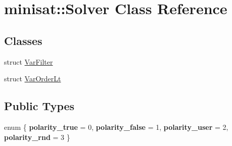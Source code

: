 \hypertarget{classminisat_1_1Solver}{\section{minisat\-:\-:\-Solver \-Class \-Reference}
\label{classminisat_1_1Solver}
}
\subsection*{\-Classes}
\begin{DoxyCompactItemize}
\item 
struct \hyperlink{structminisat_1_1Solver_1_1VarFilter}{\-Var\-Filter}
\item 
struct \hyperlink{structminisat_1_1Solver_1_1VarOrderLt}{\-Var\-Order\-Lt}
\end{DoxyCompactItemize}
\subsection*{\-Public \-Types}
\begin{DoxyCompactItemize}
\item 
enum \{ {\bfseries polarity\-\_\-true} =  0, 
{\bfseries polarity\-\_\-false} =  1, 
{\bfseries polarity\-\_\-user} =  2, 
{\bfseries polarity\-\_\-rnd} =  3
 \}
\end{DoxyCompactItemize}
